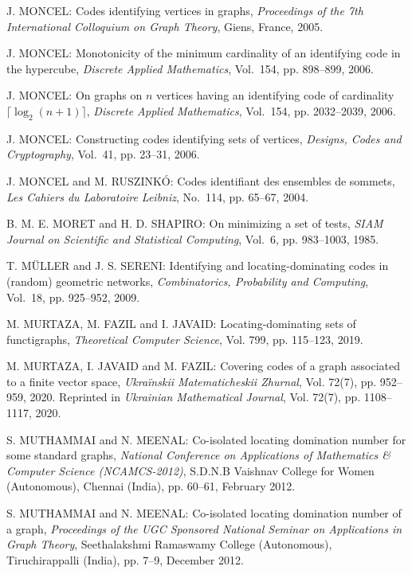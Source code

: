 \begin{thebibliography}{999}
J. MONCEL: Codes identifying vertices in graphs, {\it Proceedings of the 7th International Colloquium on Graph Theory}, Giens, France, 2005.

J. MONCEL: Monotonicity of the minimum cardinality of an identifying code in the hypercube, {\it Discrete Applied Mathematics}, Vol.~154, pp. 898--899, 2006.

J. MONCEL: On graphs on $n$ vertices having an identifying code of cardinality $\lceil \log_2 (n+1)\rceil$, {\it Discrete Applied Mathematics}, Vol.~154, pp. 2032--2039, 2006.

J. MONCEL: Constructing codes identifying sets of vertices, {\it Designs, Codes and Cryptography}, Vol.~41, pp. 23--31, 2006.

J. MONCEL and M. RUSZINK\'O: Codes identifiant des ensembles de sommets, {\it Les Cahiers du Laboratoire Leibniz}, No.~114, pp. 65--67, 2004.

B. M. E. MORET and H. D. SHAPIRO: On minimizing a set of tests, {\it SIAM Journal on Scientific and Statistical Computing}, Vol.~6, pp. 983--1003, 1985. 

T. M\"{U}LLER and J. S. SERENI: Identifying and locating-dominating codes in (random) geometric networks, {\it Combinatorics, Probability and Computing}, Vol.~18, pp. 925--952, 2009.

M. MURTAZA, M. FAZIL and I. JAVAID: Locating-dominating sets of functigraphs, {\it Theoretical Computer Science}, Vol. 799, pp. 115--123, 2019.

M. MURTAZA, I. JAVAID and M. FAZIL: Covering codes of a graph associated to a finite vector space, {\it Ukra\"{i}nskii Matematicheskii Zhurnal}, Vol. 72(7), pp. 952--959, 2020. Reprinted in {\it Ukrainian Mathematical Journal}, Vol. 72(7), pp. 1108--1117, 2020.

S. MUTHAMMAI and N. MEENAL: Co-isolated locating domination number for  some  standard  graphs, {\it National Conference on  Applications of Mathematics \& Computer Science (NCAMCS-2012)}, S.D.N.B  Vaishnav College for Women (Autonomous), Chennai (India), pp.  60--61, February 2012.

S. MUTHAMMAI and N. MEENAL: Co-isolated locating domination number of a  graph, {\it Proceedings of the UGC Sponsored National Seminar on  Applications  in  Graph Theory}, Seethalakshmi  Ramaswamy  College (Autonomous), Tiruchirappalli (India), pp. 7--9, December 2012.


\end{thebibliography}
